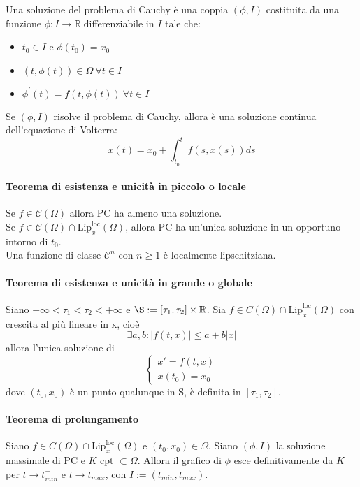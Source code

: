 \documentclass[a4paper,12pt]{article}
\newcommand{\cont}{\mathscr{C}}
\begin{document}
Una soluzione del problema di Cauchy è una coppia $\left( \phi , I \right)$ costituita da una funzione $\phi: I \longrightarrow \mathbb{R}$ differenziabile in $I$ tale che:
\begin{itemize}
\item $t_0 \in I$ e $ \phi\left(t_0\right)=x_0$
\item $ \left(t,\phi\left(t\right)\right) \in \Omega \ \forall t \in I$
\item $ \phi^{'}\left(t \right) = f\left(t,\phi\left(t\right)\right)\ \forall t \in I$
\end{itemize}

Se $\left(\phi,I\right)$ risolve il problema di Cauchy, allora è una soluzione continua dell'equazione di Volterra:
$$ x\left(t\right) = x_0 + \displaystyle\int^t_{t_0} f\left(s,x\left(s\right)\right) ds $$

\paragraph{Teorema di esistenza e unicità in piccolo o locale}
Se $f \in \cont \left(\Omega\right)$ allora PC ha almeno una soluzione. \\
Se $f \in \cont \left(\Omega\right) \cap \text{Lip}^{\text{loc}}_x\left(\Omega\right)$, allora PC ha un'unica soluzione in un opportuno intorno di $t_0$.\\
Una funzione di classe $\cont^n$ con $ n \geq 1 $ è localmente lipschitziana. 

\paragraph{Teorema di esistenza e unicità in grande o globale}
Siano $-\infty < \tau_1 < \tau_2 < +\infty$ e $\S:=\left[\tau_1,\tau_2\right]\times\mathbb{R}$. Sia $f \in C\left(\Omega\right) \cap \text{Lip}^{\text{loc}}_x\left(\Omega\right)$ con crescita al più lineare in x, cioè
$$\exists a,b: |f \left(t,x\right)|\leq a + b|x|$$
allora l'unica soluzione di 
$$\begin{cases} x'=f\left(t,x\right) \\ x\left(t_0\right)=x_0 \end{cases}$$
dove $\left(t_0,x_0\right)$ è un punto qualunque in S, è definita in $\left[\tau_1,\tau_2\right]$.

\paragraph{Teorema di prolungamento}
Siano  $f \in C\left(\Omega\right) \cap \text{Lip}^{\text{loc}}_x\left(\Omega\right)$ e $\left(t_0,x_0\right) \in \Omega$. Siano $\left(\phi,I\right)$ la soluzione massimale di PC e $K$ cpt $\subset \Omega$. Allora il grafico di $\phi$ esce definitivamente da $K$ per $t\rightarrow t^+_{min}$ e $t\rightarrow t^-_{max}$, con $I:=(t_{min},t_{max})$.
\end{document}
